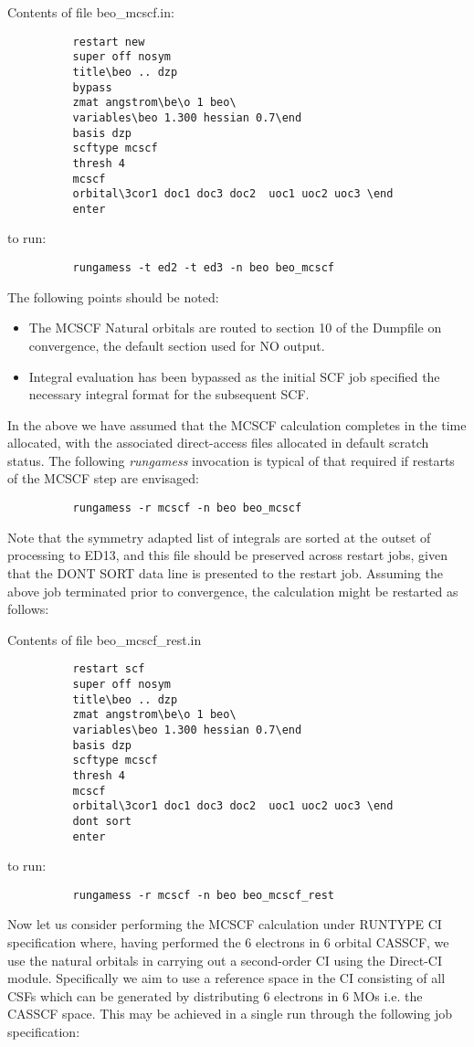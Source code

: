 \documentclass[11pt,fleqn]{article}
\begin{document}
Contents of file beo\_mcscf.in:
{
\footnotesize
\begin{verbatim}
          restart new
          super off nosym
          title\beo .. dzp
          bypass
          zmat angstrom\be\o 1 beo\
          variables\beo 1.300 hessian 0.7\end
          basis dzp
          scftype mcscf
          thresh 4
          mcscf
          orbital\3cor1 doc1 doc3 doc2  uoc1 uoc2 uoc3 \end
          enter
\end{verbatim}
}
to run:
{
\footnotesize
\begin{verbatim}
          rungamess -t ed2 -t ed3 -n beo beo_mcscf
\end{verbatim}
}
The following points should be noted:
\begin{itemize}
\item  The MCSCF Natural orbitals are routed to section 10 of the
Dumpfile on convergence, the default section used for NO output.
\item  Integral evaluation has been bypassed as the
initial SCF job specified the necessary integral format
for the subsequent SCF.
\end{itemize}
In the above we have assumed that the MCSCF calculation
completes in the time allocated, with the associated 
direct-access files allocated in default scratch status.
The following {\em rungamess} invocation
is typical of that required if restarts of the MCSCF step
are envisaged:

{
\footnotesize
\begin{verbatim}
          rungamess -r mcscf -n beo beo_mcscf
\end{verbatim}
}
Note that the symmetry adapted list of integrals are
sorted at the outset of processing to ED13, and this file
should be preserved across restart jobs, given that the
DONT SORT data line is presented to the restart job.
Assuming the above job terminated prior to convergence, the
calculation might be restarted as follows:

Contents of file beo\_mcscf\_rest.in
{
\footnotesize
\begin{verbatim}
          restart scf
          super off nosym
          title\beo .. dzp
          zmat angstrom\be\o 1 beo\
          variables\beo 1.300 hessian 0.7\end
          basis dzp
          scftype mcscf
          thresh 4
          mcscf
          orbital\3cor1 doc1 doc3 doc2  uoc1 uoc2 uoc3 \end
          dont sort
          enter
\end{verbatim}
}
to run:
{
\footnotesize
\begin{verbatim}
          rungamess -r mcscf -n beo beo_mcscf_rest
\end{verbatim}
}
Now let us consider performing the MCSCF calculation under
RUNTYPE CI specification where, having performed the 6 electrons in
6 orbital CASSCF, we use the natural orbitals in carrying out
a second-order CI using the Direct-CI module. Specifically we
aim to use a reference space in the CI consisting of all CSFs which
can be generated by distributing 6 electrons in 6 MOs i.e. the
CASSCF  space.  This may be achieved in a single run through the
following job specification:
\end{document}
